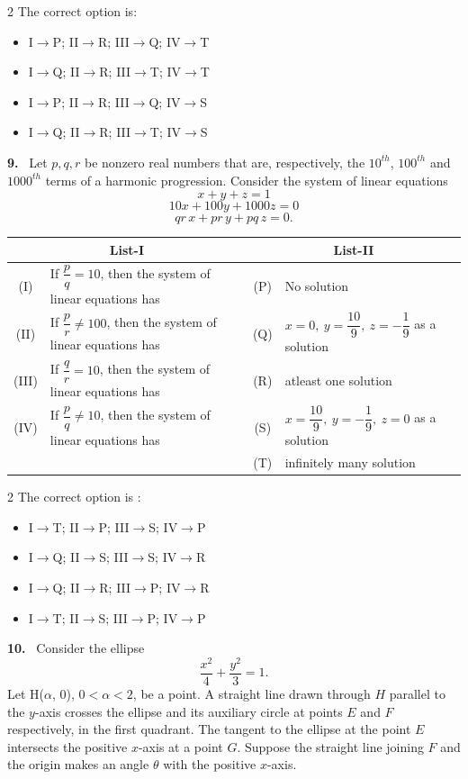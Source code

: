 \documentclass[10pt]{extarticle}
\newcommand{\qn}[1]{\par\smallskip\noindent\textbf{#1.}~}
\newenvironment{qoptions}{\begin{itemize}[leftmargin=1.8em,itemsep=1pt,topsep=2pt,label={}]}{\end{itemize}}
\newcommand{\opt}[2]{\item[(#1)] #2}
\begin{document}
\begin{multicols}{2}
The correct option is:
\begin{qoptions}
\opt{A}{I$\to$P; II$\to$R; III$\to$Q; IV$\to$T}
\opt{B}{I$\to$Q; II$\to$R; III$\to$T; IV$\to$T}
\opt{C}{I$\to$P; II$\to$R; III$\to$Q; IV$\to$S}
\opt{D}{I$\to$Q; II$\to$R; III$\to$T; IV$\to$S}
\end{qoptions}

\qn{9} Let $p,q,r$ be nonzero real numbers that are, respectively, the $10^{th}$, $100^{th}$ and $1000^{th}$ terms of a harmonic progression. Consider the system of linear equations
\[x+y+z=1\]
\[10x+100y+1000z=0\]
\[qr\,x+pr\,y+pq\,z=0.\]
\end{multicols}
\begin{center}
\begin{tabular}{|c|p{7cm}|c|l|}
\hline
\multicolumn{2}{|c|}{List-I} & \multicolumn{2}{c|}{List-II} \\
\hline
(I) & If $\dfrac{p}{q}=10$, then the system of linear equations has & (P) & No solution \\
\hline
(II) & If $\dfrac{p}{r}\ne100$, then the system of linear equations has & (Q) & $x=0,\ y=\dfrac{10}{9},\ z=-\dfrac19$ as a solution \\
\hline
(III) & If $\dfrac{q}{r}=10$, then the system of linear equations has & (R) & atleast one solution \\
\hline
(IV) & If $\dfrac{p}{q}\ne10$, then the system of linear equations has & (S) & $x=\dfrac{10}{9},\ y=-\dfrac19,\ z=0$ as a solution \\
\hline
& & (T) & infinitely many solution \\
\hline
\end{tabular}
\end{center}
\begin{multicols}{2}
The correct option is :
\begin{qoptions}
\opt{A}{I$\to$T; II$\to$P; III$\to$S; IV$\to$P}
\opt{B}{I$\to$Q; II$\to$S; III$\to$S; IV$\to$R}
\opt{C}{I$\to$Q; II$\to$R; III$\to$P; IV$\to$R}
\opt{D}{I$\to$T; II$\to$S; III$\to$P; IV$\to$P}
\end{qoptions}

\qn{10} Consider the ellipse
\[\dfrac{x^2}{4}+\dfrac{y^2}{3}=1.\]
Let H($\alpha$, 0), $0<\alpha<2$, be a point. A straight line drawn through $H$ parallel to the $y$-axis crosses the ellipse and its auxiliary circle at points $E$ and $F$ respectively, in the first quadrant. The tangent to the ellipse at the point $E$ intersects the positive $x$-axis at a point $G$. Suppose the straight line joining $F$ and the origin makes an angle $\theta$ with the positive $x$-axis.
\end{multicols}
\end{document}
